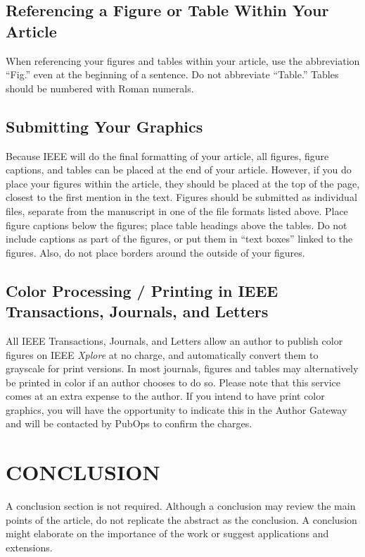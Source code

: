 \documentclass{IEEEtaes}
\begin{document}
\subsection{Referencing a Figure or Table Within Your Article}

When referencing your figures and tables within your article, use the abbreviation ``Fig.'' even at the beginning of a sentence. Do not abbreviate ``Table.'' Tables should be numbered with Roman numerals.\vspace*{-.5pc}

\subsection{Submitting Your Graphics}

Because IEEE will do the final formatting of your article, all figures, figure captions, and tables can be placed at the end of your article. However, if you do place your figures within the article, they should be placed at the top of the page, closest to the first mention in the text. Figures should be submitted as individual files, separate from the manuscript in one of the file formats listed above. Place figure captions below the figures; place table headings above the tables. Do not include captions as part of the figures, or put them in ``text boxes'' linked to the figures. Also, do not place borders around the outside of your figures.\vspace*{-.5pc}

\subsection{Color Processing / Printing in IEEE Transactions, Journals, and Letters}

All IEEE Transactions, Journals, and Letters allow an author to publish color figures on IEEE \emph{Xplore} at no charge, and automatically convert them to grayscale for print versions. In most journals, figures and tables may alternatively be printed in color if an author chooses to do so. Please note that this service comes at an extra expense to the author. If you intend to have print color graphics, you will have the opportunity to indicate this in the Author Gateway and will be contacted by PubOps to confirm the charges.\vspace*{-.5pc}

\section{CONCLUSION}
A conclusion section is not required. Although a conclusion may review the main points of the article, do not replicate the abstract as the conclusion. A conclusion might elaborate on the importance of the work or suggest applications and extensions.\vspace*{-.5pc}
\end{document}
